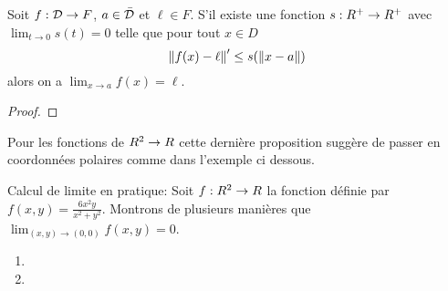\begin{proposition}
    Soit $f:\mathcal{D} \to F$, $a \in \bar {\mathcal{D}} $ et $\ell\in F$. S'il existe une fonction %
    $s: R^+ \to R^+$ avec $\lim_{t\to 0} s(t) = 0$ telle que pour tout $x\in D$ 
    \[
        \left\lVert f(x) - \ell\right\rVert' \leq s(\left\lVert x-a\right\rVert)
    \]
    alors on a $\lim_{x \to a } f(x) = \ell$.
\end{proposition}

\begin{proof}
    \pl{\rep{5cm}}	
\end{proof}

\begin{remark}
    Pour les fonctions de $R^2 \to R$ cette dernière proposition suggère de passer en coordonnées polaires comme dans l'exemple ci dessous.
\end{remark}

\begin{exemple}
    Calcul de limite en pratique: Soit $f: R^2 \to R$ la fonction définie par $f(x,y) = \frac{6x^2y}{x^2+y^2}$. Montrons de plusieurs manières que $\lim_{(x,y) \to (0,0)} f(x,y) = 0$.
    \begin{enumerate}
        \item {}\pl{\rep{4cm}}
        \item {}\pl{\rep{4cm}}
    \end{enumerate}

\end{exemple}

